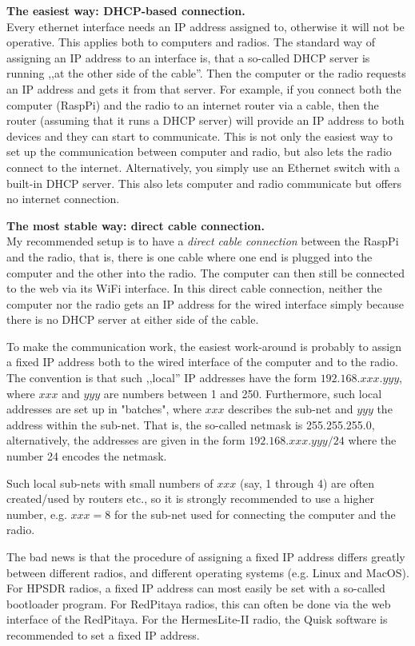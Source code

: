 \documentclass[12pt]{book}
\begin{document}
\textbf{The easiest way: DHCP-based connection.}\\
Every ethernet interface needs an IP address assigned to, otherwise it will not be operative. This applies
both to computers and radios. The standard way of assigning an IP address to an interface is, that
a so-called DHCP server is running ,,at the other side of the cable''. Then the computer or the radio
requests an IP address and gets it from that server. For example, if you connect both the computer (RaspPi)
and the radio to an internet router via a cable, then the router (assuming that it runs a DHCP server)
will provide an IP address to both devices and they can start to communicate. This is not only the
easiest way to set up the communication between computer and radio, but also lets the radio connect
to the internet. Alternatively, you simply use an Ethernet switch with a built-in DHCP server. This also
lets computer and radio communicate but offers no internet connection.

\textbf{The most stable way: direct cable connection.}\\
My recommended setup is to have a \textit{direct cable connection} between the RaspPi and the radio, that
is, there is one cable where one end is plugged into the computer and the other into the radio. The computer
can then still be connected to the web via its WiFi interface. In this direct cable connection, neither
the computer nor the radio gets an IP address for the wired interface simply because there is no DHCP server
at either side of the cable.

To make the communication work, the easiest work-around is probably to assign a fixed IP address both to
the wired interface of the computer and to the radio. The convention is that such ,,local'' IP addresses have
the form $192.168.xxx.yyy$, where $xxx$ and $yyy$ are numbers between 1 and 250. Furthermore, such
local addresses are set up in "batches", where $xxx$ describes the sub-net and $yyy$ the address within the
sub-net. That is, the so-called netmask is 255.255.255.0, alternatively, the addresses are given in the
form $192.168.xxx.yyy/24$ where the number 24 encodes the netmask.

Such local sub-nets with small numbers of $xxx$ (say, 1 through 4) are often created/used by routers etc.,
so it is strongly recommended to use a higher number, e.g. $xxx=8$ for the sub-net used for connecting
the computer and the radio.

The bad news is that the procedure of assigning a fixed IP address differs greatly between different
radios, and different operating systems (e.g. Linux and MacOS). For HPSDR radios, a fixed IP address
can most easily be set with a so-called bootloader program. For RedPitaya radios, this can often
be done via the web interface of the RedPitaya. For the HermesLite-II radio, the Quisk software
is recommended to set a fixed IP address.
\end{document}
